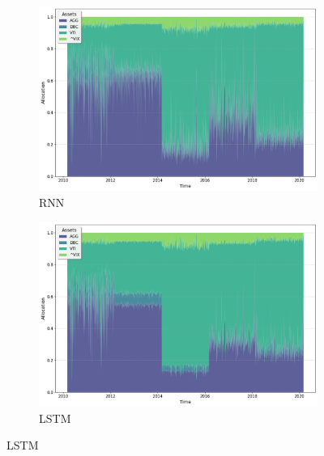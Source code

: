 \documentclass[11pt]{article}
\begin{document}
\begin{figure}[h]
    \centering

    \begin{subfigure}[b]{0.45\textwidth}
        \centering
        \includegraphics[width=\textwidth]{images/stackplot_rnn.png}
        \caption{RNN}
    \end{subfigure}
    \hfill
    \begin{subfigure}[b]{0.45\textwidth}
        \centering
        \includegraphics[width=\textwidth]{images/stackplot_lstm.png}
        \caption{LSTM}
    \end{subfigure}


\end{figure}
\end{document}
